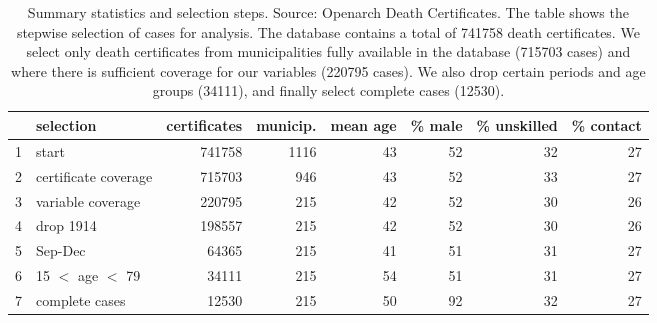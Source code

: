 \begin{table}[ht]
\centering
\begin{tabular}{rlrrrrrr}
  \hline
 & selection & certificates & municip. & mean age & \% male & \% unskilled & \% contact \\ 
  \hline
1 & start & 741758 & 1116 & 43 & 52 & 32 & 27 \\ 
  2 & certificate coverage & 715703 & 946 & 43 & 52 & 33 & 27 \\ 
  3 & variable coverage & 220795 & 215 & 42 & 52 & 30 & 26 \\ 
  4 & drop 1914 & 198557 & 215 & 42 & 52 & 30 & 26 \\ 
  5 & Sep-Dec & 64365 & 215 & 41 & 51 & 31 & 27 \\ 
  6 & 15 $<$ age $<$ 79 & 34111 & 215 & 54 & 51 & 31 & 27 \\ 
  7 & complete cases & 12530 & 215 & 50 & 92 & 32 & 27 \\ 
   \hline
\end{tabular}
\caption{Summary statistics and selection steps. Source: Openarch Death Certificates. The table shows the stepwise selection of cases for analysis. The database contains a total of 741758 death certificates. We select only death certificates from municipalities fully available in the database (715703 cases) and where there is sufficient coverage for our variables (220795 cases). We also drop certain periods and age groups (34111), and finally select complete cases (12530).} 
\label{sumselect}
\end{table}
